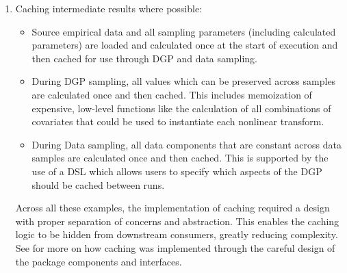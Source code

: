 \documentclass[./main.tex]{subfiles}
\begin{document}
\begin{enumerate}
    \item Caching intermediate results where possible:
    
    \begin{itemize}
        \item Source empirical data and all sampling parameters (including calculated parameters) are loaded and calculated once at the start of execution and then cached for use through DGP and data sampling.
        
        \item During DGP sampling, all values which can be preserved across samples are calculated once and then cached. This includes memoization of expensive, low-level functions like the calculation of all combinations of covariates that could be used to instantiate each nonlinear transform.
        
        \item During Data sampling, all data components that are constant across data samples are calculated once and then cached. This is supported by the use of a DSL which allows users to specify which aspects of the DGP should be cached between runs.
        
    \end{itemize}
    
    Across all these examples, the implementation of caching required a design with proper separation of concerns and abstraction. This enables the caching logic to be hidden from downstream consumers, greatly reducing complexity. See  for more on how caching was implemented through the careful design of the package components and interfaces.
    

\end{enumerate}
\end{document}

